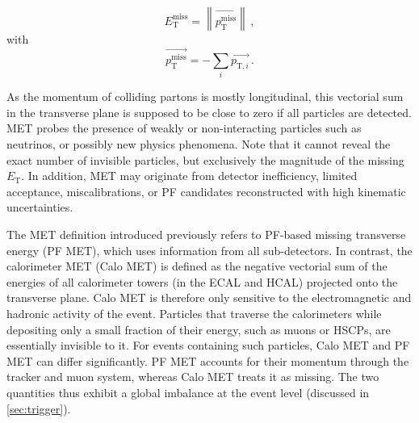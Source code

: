 \begin{equation}
    E^{\mathrm{miss}}_{\mathrm{T}} = \left\|\overrightarrow{p_{\mathrm{T}}^\textrm{miss}} \right\|\, ,
    \label{eq:metEnergy}
\end{equation}
with
\begin{equation}
    \overrightarrow{p_{\mathrm{T}}^\textrm{miss}} = -\sum_i \overrightarrow{p_{\mathrm{T},i}} \, .
    \label{eq:metpT}
\end{equation}

As the momentum of colliding partons is mostly longitudinal, this vectorial sum in the transverse plane is supposed to be close to zero if all particles are detected. MET probes the presence of weakly or non-interacting particles such as neutrinos, or possibly new physics phenomena. Note that it cannot reveal the exact number of invisible particles, but exclusively the magnitude of the missing $E_{\mathrm{T}}$. In addition, MET may originate from detector inefficiency, limited acceptance, miscalibrations, or PF candidates reconstructed with high kinematic uncertainties.

\vspace{0.5 cm}

The MET definition introduced previously refers to PF-based missing transverse energy (PF MET), which uses information from all sub-detectors. In contrast, the calorimeter MET (Calo MET) is defined as the negative vectorial sum of the energies of all calorimeter towers (in the ECAL and HCAL) projected onto the transverse plane. Calo MET is therefore only sensitive to the electromagnetic and hadronic activity of the event. Particles that traverse the calorimeters while depositing only a small fraction of their energy, such as muons or HSCPs, are essentially invisible to it. For events containing such particles, Calo MET and PF MET can differ significantly. PF MET accounts for their momentum through the tracker and muon system, whereas Calo MET treats it as missing. The two quantities thus exhibit a global imbalance at the event level (discussed in \cref{sec:trigger}).

\vspace{0.5 cm}

